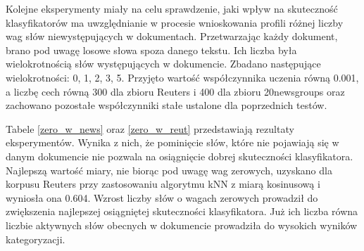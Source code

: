 \documentclass{pracamgr}
\begin{document}
Kolejne eksperymenty miały na celu sprawdzenie, jaki wpływ na skuteczność klasyfikatorów ma uwzględnianie w procesie wnioskowania profili różnej liczby wag słów niewystępujących w dokumentach. Przetwarzając każdy dokument, brano pod uwagę losowe słowa spoza danego tekstu. Ich liczba była wielokrotnością słów występujących w dokumencie. Zbadano następujące wielokrotności: 0, 1, 2, 3, 5. Przyjęto wartość współczynnika uczenia równą 0.001, a liczbę cech równą 300 dla zbioru Reuters i 400 dla zbioru 20newsgroups oraz zachowano pozostałe współczynniki stałe ustalone dla poprzednich testów. 

Tabele \ref{zero_w_news} oraz \ref{zero_w_reut} przedstawiają rezultaty eksperymentów. Wynika z nich, że pominięcie słów, które nie pojawiają się w danym dokumencie nie pozwala na osiągnięcie dobrej skuteczności klasyfikatora. Najlepszą wartość miary, nie biorąc pod uwagę wag zerowych, uzyskano dla korpusu Reuters przy zastosowaniu algorytmu kNN z miarą kosinusową i wyniosła ona 0.604. Wzrost liczby słów o wagach zerowych prowadził do zwiększenia najlepszej osiągniętej skuteczności klasyfikatora. Już ich liczba równa liczbie aktywnych słów obecnych w dokumencie prowadziła do wysokich wyników kategoryzacji.

\begin{table}[]
\centering
{}
\caption{Zależność między współczynnikiem doboru wag zerowych a najlepszą dokładnością klasyfikatora - 20newsgroups}
\label{zero_w_news}
\end{table}
\end{document}
